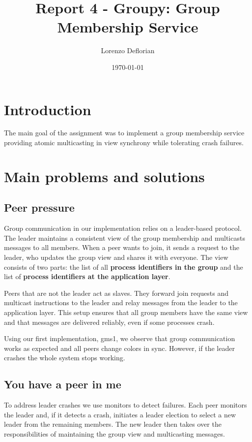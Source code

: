 \documentclass[a4paper, 11pt]{article}
\title{Report 4 - Groupy: Group Membership Service}
\author{Lorenzo Deflorian}
\date{\today{}}
\begin{document}
\maketitle

\section{Introduction}
The main goal of the assignment was to implement a group membership service providing atomic multicasting in view synchrony while tolerating crash failures.

\section{Main problems and solutions}
\subsection{Peer pressure}
Group communication in our implementation relies on a leader-based protocol. The leader maintains a consistent view of the group membership and multicasts messages to all members. When a peer wants to join, it sends a request to the leader, who updates the group view and shares it with everyone. The view consists of two parts: the list of all \textbf{process identifiers in the group} and the list of \textbf{process identifiers at the application layer}.

Peers that are not the leader act as slaves. They forward join requests and multicast instructions to the leader and relay messages from the leader to the application layer. This setup ensures that all group members have the same view and that messages are delivered reliably, even if some processes crash.

Using our first implementation, gms1, we observe that group communication works as expected and all peers change colors in sync. However, if the leader crashes the whole system stops working.

\subsection{You have a peer in me}
To address leader crashes we use monitors to detect failures. Each peer monitors the leader and, if it detects a crash, initiates a leader election to select a new leader from the remaining members. The new leader then takes over the responsibilities of maintaining the group view and multicasting messages.
\end{document}
